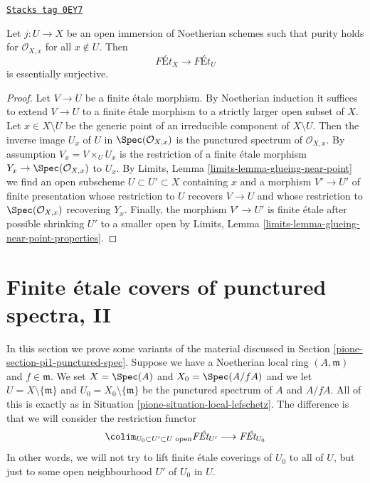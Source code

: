 \begin{lemma}
\label{pione-lemma-extend-pure}
\href{https://stacks.math.columbia.edu/tag/0EY7}{\texttt{Stacks tag 0EY7}}

Let $j : U \to X$ be an open immersion of Noetherian schemes
such that purity holds for $\mathcal{O}_{X, x}$ for all $x \not \in U$.
Then
$$
\textit{F\'Et}_X \longrightarrow \textit{F\'Et}_U
$$
is essentially surjective.
\end{lemma}

\begin{proof}
Let $V \to U$ be a finite \'etale morphism. By Noetherian
induction it suffices to extend $V \to U$ to a finite \'etale
morphism to a strictly larger open subset of $X$.
Let $x \in X \setminus U$ be the generic point of
an irreducible component of $X \setminus U$.
Then the inverse image $U_x$ of $U$ in $\Spec(\mathcal{O}_{X, x})$
is the punctured spectrum of $\mathcal{O}_{X, x}$.
By assumption $V_x = V \times_U U_x$ is the restriction
of a finite \'etale morphism $Y_x \to \Spec(\mathcal{O}_{X, x})$
to $U_x$.
By Limits, Lemma \ref{limits-lemma-glueing-near-point}
we find an open subscheme $U \subset U' \subset X$
containing $x$ and a morphism $V' \to U'$ of finite presentation
whose restriction to $U$ recovers $V \to U$ and
whose restriction to $\Spec(\mathcal{O}_{X, x})$ recovering $Y_x$.
Finally, the morphism $V' \to U'$ is finite \'etale
after possible shrinking $U'$ to a smaller open by
Limits, Lemma \ref{limits-lemma-glueing-near-point-properties}.
\end{proof}

\section{Finite \'etale covers of punctured spectra, II}
\label{pione-section-pi1-punctured-spec-II}
In this section we prove some variants of the material discussed
in Section \ref{pione-section-pi1-punctured-spec}. Suppose
we have a Noetherian local ring $(A, \mathfrak m)$ and $f \in \mathfrak m$.
We set $X = \Spec(A)$ and $X_0 = \Spec(A/fA)$ and we
let $U = X \setminus \{\mathfrak m\}$ and
$U_0 = X_0 \setminus \{\mathfrak m\}$ be the punctured spectrum of
$A$ and $A/fA$. All of this is exactly as in
Situation \ref{pione-situation-local-lefschetz}.
The difference is that we will consider the restriction functor
$$
\colim_{U_0 \subset U' \subset U\text{ open}} \textit{F\'Et}_{U'}
\longrightarrow
\textit{F\'Et}_{U_0}
$$
In other words, we will not try to lift finite \'etale coverings
of $U_0$ to all of $U$, but just to some open neighbourhood
$U'$ of $U_0$ in $U$.

